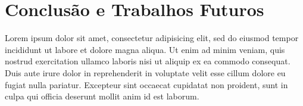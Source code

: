 \section{Conclusão e Trabalhos Futuros} \label{sec-conclusion}


Lorem ipsum dolor sit amet, consectetur adipisicing elit, sed do eiusmod
tempor incididunt ut labore et dolore magna aliqua. Ut enim ad minim veniam,
quis nostrud exercitation ullamco laboris nisi ut aliquip ex ea commodo
consequat. Duis aute irure dolor in reprehenderit in voluptate velit esse
cillum dolore eu fugiat nulla pariatur. Excepteur sint occaecat cupidatat non
proident, sunt in culpa qui officia deserunt mollit anim id est laborum.